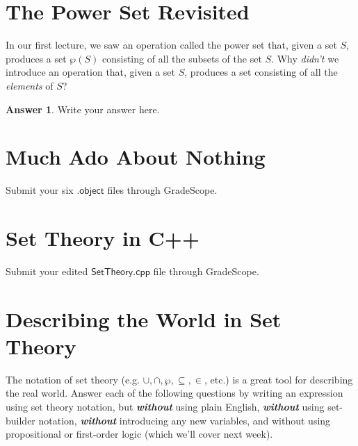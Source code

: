 \documentclass{article}
\renewcommand{\(}{\left(}
\renewcommand{\)}{\right)}
\theoremstyle{plain}
\theoremstyle{plain}
\theoremstyle{definition}
\newtheorem*{answer}{Answer}
\begin{document}
\section{The Power Set Revisited}

In our first lecture, we saw an operation called the power set that, given a set $S$, produces a set $\wp(S)$ consisting of all the subsets of the set $S$. Why \textit{didn't} we introduce an operation that, given a set $S$, produces a set consisting of all the \textit{elements} of $S$?

\begin{shaded}
\begin{answer}
Write your answer here.
\end{answer}
\end{shaded}

\section{Much Ado About Nothing}

\begin{shaded}
Submit your six $\mathsf{.object}$ files through GradeScope.
\end{shaded}

\section{Set Theory in C++}

\begin{shaded}
Submit your edited $\mathsf{SetTheory.cpp}$ file through GradeScope.
\end{shaded}

\section{Describing the World in Set Theory}

The notation of set theory (e.g. $\cup, \cap, \wp, \subseteq, \in$, etc.) is a great tool for describing the real world. Answer
each of the following questions by writing an expression using set theory notation, but \textit{\textbf{without}} using
plain English, \textit{\textbf{without}} using set-builder notation, \textit{\textbf{without}} introducing any new variables, and without using propositional or first-order logic (which we'll cover next week).
\end{document}

